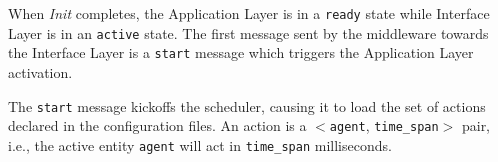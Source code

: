 
When \textit{Init} completes, the Application Layer is in a \verb|ready| state
while Interface Layer is in an \verb|active| state.
The first message sent by the middleware towards the Interface Layer is a
\verb|start| message which triggers the Application Layer activation.

The \verb|start| message kickoffs the scheduler, causing it to load the set
of actions declared in the configuration files. An action is a $<$\verb|agent|,
\verb|time_span|$>$ pair, i.e., the active entity \verb|agent| will act in
\verb|time_span| milliseconds.
